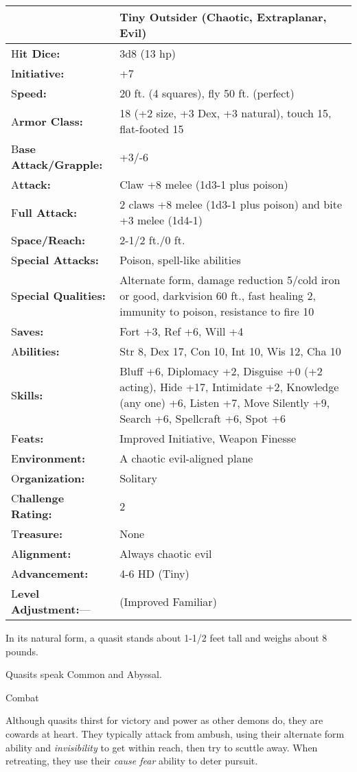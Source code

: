 \documentclass{article}
\begin{document}
\begin{tabular}{|>{\raggedright}p{88pt}|>{\raggedright}p{237pt}|}
\hline
  & Tiny Outsider (Chaotic, Extraplanar, Evil)\tabularnewline
\hline
H\textbf{it Dice:} & 3d8 (13 hp)\tabularnewline
\hline
I\textbf{nitiative:} & +7\tabularnewline
\hline
S\textbf{peed:} & 20 ft. (4 squares), fly 50 ft. (perfect)\tabularnewline
\hline
A\textbf{rmor Class:} & 18 (+2 size, +3 Dex, +3 natural), touch 15, flat-footed 
15\tabularnewline
\hline
B\textbf{ase Attack/Grapple:} & +3/-6\tabularnewline
\hline
A\textbf{ttack:} & Claw +8 melee (1d3-1 plus poison)\tabularnewline
\hline
F\textbf{ull Attack:} & 2 claws +8 melee (1d3-1 plus poison) and bite +3 melee 
(1d4-1)\tabularnewline
\hline
S\textbf{pace/Reach:} & 2-1/2 ft./0 ft.\tabularnewline
\hline
S\textbf{pecial Attacks:} & Poison, spell-like abilities\tabularnewline
\hline
S\textbf{pecial Qualities:} & Alternate form, damage reduction 5/cold iron or good, 
darkvision 60 ft., fast healing 2, immunity to poison, resistance to fire 10\tabularnewline
\hline
S\textbf{aves:} & Fort +3, Ref +6, Will +4\tabularnewline
\hline
A\textbf{bilities:} & Str 8, Dex 17, Con 10, Int 10, Wis 12, Cha 10\tabularnewline
\hline
S\textbf{kills:} & Bluff +6, Diplomacy +2, Disguise +0 (+2 acting), Hide +17, Intimidate 
+2, Knowledge (any one) +6, Listen +7, Move Silently +9, Search +6, Spellcraft 
+6, Spot +6 \tabularnewline
\hline
F\textbf{eats:} & Improved Initiative, Weapon Finesse\tabularnewline
\hline
E\textbf{nvironment:} & A chaotic evil-aligned plane\tabularnewline
\hline
O\textbf{rganization:} & Solitary\tabularnewline
\hline
C\textbf{hallenge Rating:} & 2\tabularnewline
\hline
T\textbf{reasure:} & None\tabularnewline
\hline
A\textbf{lignment:} & Always chaotic evil\tabularnewline
\hline
A\textbf{dvancement:} & 4-6 HD (Tiny)\tabularnewline
\hline
L\textbf{evel Adjustment:}--- &  (Improved Familiar)\tabularnewline
\hline
\end{tabular}

In its natural form, a quasit stands about 1-1/2 feet tall and weighs about 8 pounds.

Quasits speak Common and Abyssal.

Combat

Although quasits thirst for victory and power as other demons do, they are cowards 
at heart. They typically attack from ambush, using their alternate form ability 
and \textit{invisibility }to get within reach, then try to scuttle away. When retreating, 
they use their \textit{cause fear }ability to deter pursuit. 
\end{document}
